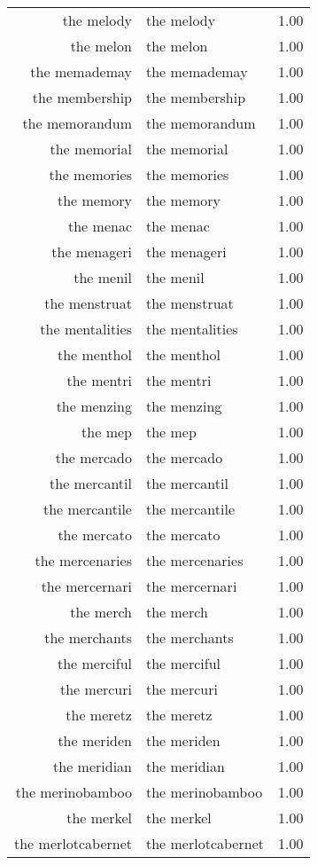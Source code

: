 \begin{table}[ht]
\begin{tabular}{rlr}
  the melody & the melody & 1.00 \\ 
  the melon & the melon & 1.00 \\ 
  the memademay & the memademay & 1.00 \\ 
  the membership & the membership & 1.00 \\ 
  the memorandum & the memorandum & 1.00 \\ 
  the memorial & the memorial & 1.00 \\ 
  the memories & the memories & 1.00 \\ 
  the memory & the memory & 1.00 \\ 
  the menac & the menac & 1.00 \\ 
  the menageri & the menageri & 1.00 \\ 
  the menil & the menil & 1.00 \\ 
  the menstruat & the menstruat & 1.00 \\ 
  the mentalities & the mentalities & 1.00 \\ 
  the menthol & the menthol & 1.00 \\ 
  the mentri & the mentri & 1.00 \\ 
  the menzing & the menzing & 1.00 \\ 
  the mep & the mep & 1.00 \\ 
  the mercado & the mercado & 1.00 \\ 
  the mercantil & the mercantil & 1.00 \\ 
  the mercantile & the mercantile & 1.00 \\ 
  the mercato & the mercato & 1.00 \\ 
  the mercenaries & the mercenaries & 1.00 \\ 
  the mercernari & the mercernari & 1.00 \\ 
  the merch & the merch & 1.00 \\ 
  the merchants & the merchants & 1.00 \\ 
  the merciful & the merciful & 1.00 \\ 
  the mercuri & the mercuri & 1.00 \\ 
  the meretz & the meretz & 1.00 \\ 
  the meriden & the meriden & 1.00 \\ 
  the meridian & the meridian & 1.00 \\ 
  the merinobamboo & the merinobamboo & 1.00 \\ 
  the merkel & the merkel & 1.00 \\ 
  the merlotcabernet & the merlotcabernet & 1.00 \\ 

\end{tabular}
\end{table}
